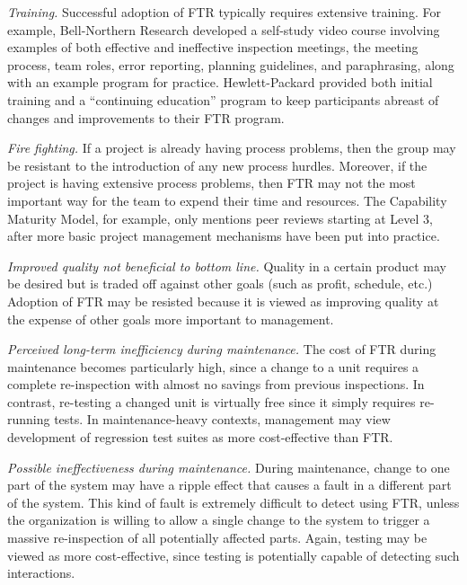 \begin{itemizenoindent}
\item {\em Training.}  Successful adoption of FTR typically requires
  extensive training. For example, Bell-Northern Research developed a
  self-study video course involving examples of both effective and
  ineffective inspection meetings, the meeting process, team roles, error
  reporting, planning guidelines, and paraphrasing, along with an example
  program for practice.  Hewlett-Packard provided both initial
  training and a ``continuing education'' program to keep participants
  abreast of changes and improvements to their FTR program.

\item {\em Fire fighting.}  If a project is already having process
  problems, then the group may be resistant to the introduction of any new process
  hurdles.  Moreover, if the project is having extensive process
  problems, then FTR may not the most important way for the team to
  expend their time and resources.  The Capability Maturity Model, for
  example, only mentions peer reviews starting at Level 3, after more basic
  project management mechanisms have been put into practice. 

\item {\em Improved quality not beneficial to bottom line.}  Quality in a
  certain product may be desired but is traded off against other goals
  (such as profit, schedule, etc.)  Adoption of FTR may be resisted
  because it is viewed as improving quality at the expense of other goals
  more important to management.

\item {\em Perceived long-term inefficiency during maintenance.}  The
  cost of FTR during maintenance becomes particularly high, since a
  change to a unit requires a complete re-inspection with almost no
  savings from previous inspections.  In contrast, re-testing a changed
  unit is virtually free since it simply requires re-running tests.  In
  maintenance-heavy contexts, management may view development of
  regression test suites as more cost-effective than FTR.


\item {\em Possible ineffectiveness during maintenance.}  During
  maintenance, change to one part of the system may have a ripple effect
  that causes a fault in a different part of the system. This kind of
  fault is extremely difficult to detect using FTR, unless the
  organization is willing to allow a single change to the system to
  trigger a massive re-inspection of all potentially affected parts.
  Again, testing may be viewed as more cost-effective, since testing is
  potentially capable of detecting such interactions.

\end{itemizenoindent}

